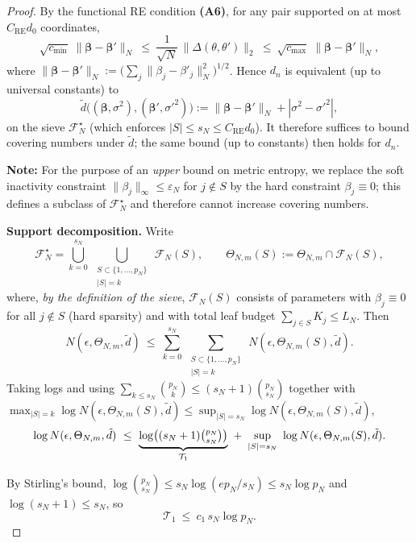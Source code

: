 \documentclass[11pt]{article}
\theoremstyle{plain}
\theoremstyle{definition}
\theoremstyle{plain}
\begin{document}
\begin{proof}
By the functional RE condition \textbf{(A6)}, for any pair supported on at most
$C_{\mathrm{RE}}d_0$ coordinates,
\[
\sqrt{c_{\min}}\;\|\bm\beta-\bm\beta'\|_{N}\ \le\ \frac{1}{\sqrt N}\,\|\Delta(\theta,\theta')\|_2\ \le\ \sqrt{c_{\max}}\;\|\bm\beta-\bm\beta'\|_{N},
\]
where $\|\bm\beta-\bm\beta'\|_N:=\big(\sum_j\|\beta_j-\beta'_j\|_N^2\big)^{1/2}$. Hence $d_n$ is equivalent (up to universal constants) to
\[
\tilde d\bigl((\bm\beta,\sigma^2),(\bm\beta',{\sigma'}^{2})\bigr):=\|\bm\beta-\bm\beta'\|_{N}+|\sigma^2-{\sigma'}^{2}|,
\]
on the sieve $\mathcal F_N^\star$ (which enforces $|S|\le s_N\le C_{\mathrm{RE}}d_0$). It therefore suffices to bound covering numbers under $\tilde d$; the same bound (up to constants) then holds for $d_n$.

\textbf{Note:} For the purpose of an \emph{upper} bound on metric entropy, we replace the soft inactivity constraint  $\|\beta_j\|_\infty\le \varepsilon_N$ for $j\notin S$ by the hard constraint $\beta_j\equiv 0$; this defines a subclass of $\mathcal F_N^\star$ and therefore cannot increase covering numbers.

\textbf{Support decomposition.}
Write
\[
\mathcal F_N^\star=\bigcup_{k=0}^{s_N}\ \bigcup_{\substack{S\subset\{1,\dots,p_N\}\\ |S|=k}}\ \mathcal F_N(S),
\qquad
\Theta_{N,m}(S):=\Theta_{N,m}\cap\mathcal F_N(S),
\]
where, \emph{by the definition of the sieve}, $\mathcal F_N(S)$ consists of parameters with $\beta_j\equiv 0$ for all $j\notin S$ (hard sparsity) and with total leaf budget $\sum_{j\in S}K_j\le L_N$. Then
\begin{equation}\label{eq:union}
N(\epsilon,\Theta_{N,m},\tilde d)
\ \le\ \sum_{k=0}^{s_N}\ \sum_{\substack{S\subset\{1,\dots,p_N\}\\ |S|=k}}\ 
N(\epsilon,\Theta_{N,m}(S),\tilde d).
\end{equation}
Taking logs and using $\sum_{k\le s_N}\binom{p_N}{k}\le (s_N+1)\binom{p_N}{s_N}$ together with
$\max_{|S|=k}\log N(\epsilon,\Theta_{N,m}(S),\tilde d)\le \sup_{|S|=s_N}\log N(\epsilon,\Theta_{N,m}(S),\tilde d)$,
\begin{equation}\label{eq:model-select-layer}
\log N(\epsilon,\Theta_{N,m},\tilde d)\ \le\
\underbrace{\log \bigl((s_N+1)\tbinom{p_N}{s_N}\bigr)}_{\mathcal T_1}
\ +\ \sup_{|S|=s_N}\ \log N(\epsilon,\Theta_{N,m}(S),\tilde d).
\end{equation}

By Stirling’s bound, $\log\binom{p_N}{s_N}\le s_N\log(e p_N/s_N)\le s_N\log p_N$ and $\log(s_N+1)\le s_N$, so
\begin{equation}\label{eq:T1}
\mathcal T_1\ \le\ c_1\,s_N\log p_N.
\end{equation}


\end{proof}
\end{document}
